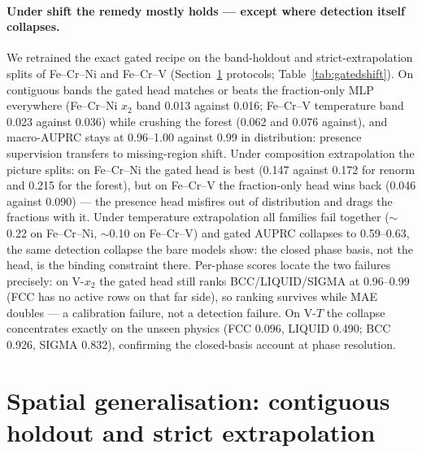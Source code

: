 \documentclass[preprint,12pt,authoryear]{elsarticle}
\begin{document}
\paragraph{Under shift the remedy mostly holds --- except where detection
itself collapses.}
We retrained the exact gated recipe on the band-holdout and
strict-extrapolation splits of Fe--Cr--Ni and Fe--Cr--V
(Section~\ref{sec:extrapolation} protocols; Table~\ref{tab:gatedshift}).
On contiguous bands the gated head matches or beats the fraction-only
MLP everywhere (Fe--Cr--Ni $x_2$ band 0.013 against 0.016; Fe--Cr--V
temperature band 0.023 against 0.036) while crushing the forest (0.062
and 0.076 against), and macro-AUPRC stays at 0.96--1.00 against 0.99 in
distribution: presence supervision transfers to missing-region shift.
Under composition extrapolation the picture splits: on Fe--Cr--Ni the
gated head is best (0.147 against 0.172 for renorm and 0.215 for the
forest), but on Fe--Cr--V the fraction-only head wins back (0.046
against 0.090) --- the presence head misfires out of distribution and
drags the fractions with it. Under temperature extrapolation all
families fail together ($\sim$0.22 on Fe--Cr--Ni, $\sim$0.10 on
Fe--Cr--V) and gated AUPRC collapses to 0.59--0.63, the same detection
collapse the bare models show: the closed phase basis, not the head, is
the binding constraint there. Per-phase scores locate the two failures
precisely: on V-$x_2$ the gated head still ranks BCC/LIQUID/SIGMA at
0.96--0.99 (FCC has no active rows on that far side), so ranking
survives while MAE doubles --- a calibration failure, not a detection
failure. On V-$T$ the collapse concentrates exactly on the unseen
physics (FCC 0.096, LIQUID 0.490; BCC 0.926, SIGMA 0.832), confirming
the closed-basis account at phase resolution.

\begin{table}[htbp]
\centering
\caption{Gated head under the spatial protocols (Fe--Cr--Ni, Fe--Cr--V).
Test MAE (mean over three seeds) with the stored same-seed, same-block
renorm-MLP and random-forest values alongside, plus gated macro-AUPRC.
Presence supervision transfers to missing-region shift and (on one
system) composition extrapolation, but not to temperature extrapolation,
where detection collapses for every model.}
\label{tab:gatedshift}
\small

\end{table}

\section{Spatial generalisation: contiguous holdout and strict
extrapolation}
\label{sec:extrapolation}
\end{document}
